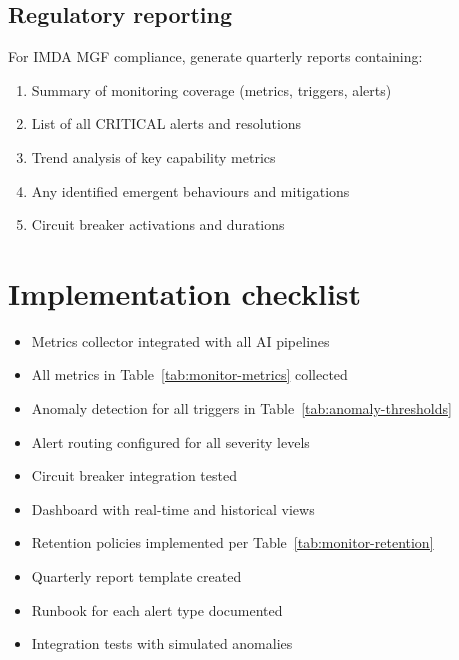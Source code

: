 \subsection{Regulatory reporting}

For IMDA MGF compliance, generate quarterly reports containing:

\begin{enumerate}
  \item Summary of monitoring coverage (metrics, triggers, alerts)
  \item List of all CRITICAL alerts and resolutions
  \item Trend analysis of key capability metrics
  \item Any identified emergent behaviours and mitigations
  \item Circuit breaker activations and durations
\end{enumerate}

\section{Implementation checklist}

\begin{itemize}
  \item[\texttt{[ ]}] Metrics collector integrated with all AI pipelines
  \item[\texttt{[ ]}] All metrics in Table~\ref{tab:monitor-metrics} collected
  \item[\texttt{[ ]}] Anomaly detection for all triggers in Table~\ref{tab:anomaly-thresholds}
  \item[\texttt{[ ]}] Alert routing configured for all severity levels
  \item[\texttt{[ ]}] Circuit breaker integration tested
  \item[\texttt{[ ]}] Dashboard with real-time and historical views
  \item[\texttt{[ ]}] Retention policies implemented per Table~\ref{tab:monitor-retention}
  \item[\texttt{[ ]}] Quarterly report template created
  \item[\texttt{[ ]}] Runbook for each alert type documented
  \item[\texttt{[ ]}] Integration tests with simulated anomalies
\end{itemize}
